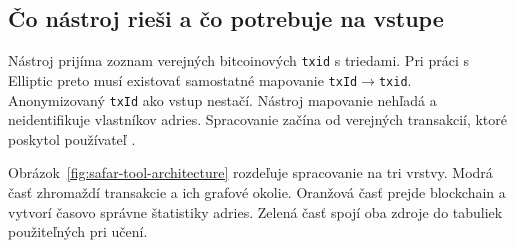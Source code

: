 \subsection{Čo nástroj rieši a čo potrebuje na vstupe}

Nástroj prijíma zoznam verejných bitcoinových \texttt{txid} s triedami.
Pri práci s Elliptic preto musí existovať samostatné mapovanie
\texttt{txId}$\rightarrow$\texttt{txid}. Anonymizovaný \texttt{txId}
ako vstup nestačí. Nástroj mapovanie nehľadá a neidentifikuje vlastníkov
adries. Spracovanie začína od verejných transakcií, ktoré poskytol
používateľ \cite{safar2026elliptic,bitcoinSubgraphBuilder}.

Obrázok~\ref{fig:safar-tool-architecture} rozdeľuje spracovanie na tri
vrstvy. Modrá časť zhromaždí transakcie a ich grafové okolie. Oranžová
časť prejde blockchain a vytvorí časovo správne štatistiky adries.
Zelená časť spojí oba zdroje do tabuliek použiteľných pri učení.

